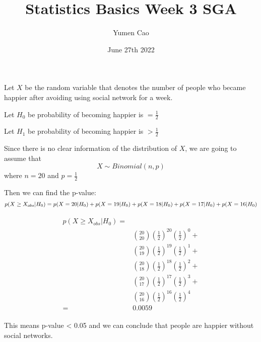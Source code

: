 \documentclass[12pt]{article}
\title{Statistics Basics Week 3 SGA}
\author{Yumen Cao}
\date{June 27th 2022}
\begin{document}
\maketitle

Let $X$ be the random variable that denotes the number of people who became happier after avoiding using social network for a week.

Let $H_0$ be probability of becoming happier is $=\frac{1}{2}$

Let $H_1$ be probability of becoming happier is  $>\frac{1}{2}$

Since there is no clear information of the distribution of $X$, we are going to assume that 
\[
X \sim Binomial (n, p)
\]
where $n=20$ and $p=\frac{1}{2}$

Then we can find the p-value:
\[
p(X\geq X_{obs}|H_0) = \\
p(X=20|H_0) + p(X=19|H_0) + p(X=18|H_0) + p(X=17|H_0) + p(X=16|H_0)
\]

\begin{align}
\begin{split}
p(X\geq X_{obs}|H_0) = &\\
&\binom{20}{20}(\frac{1}{2})^{20} (\frac{1}{2})^{0} + \\
&\binom{20}{19}(\frac{1}{2})^{19} (\frac{1}{2})^{1} + \\
&\binom{20}{18}(\frac{1}{2})^{18} (\frac{1}{2})^{2} + \\
&\binom{20}{17}(\frac{1}{2})^{17} (\frac{1}{2})^{3} + \\
&\binom{20}{16}(\frac{1}{2})^{16} (\frac{1}{2})^{4} \\
= & 0.0059
\end{split}
\end{align}

This means p-value < 0.05 and we can conclude that people are happier without social networks.
\end{document}
